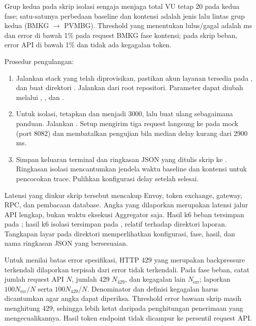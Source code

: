 Grup kedua pada skrip isolasi sengaja menjaga total VU tetap 20 pada kedua fase;
satu-satunya perbedaan baseline dan kontensi adalah jenis lalu lintas grup kedua
(BMKG $\rightarrow$ PVMBG). Threshold yang menentukan lulus/gagal adalah
 ms dan error di bawah 1\% pada request BMKG fase kontensi;
pada skrip beban, error API di bawah 1\% dan tidak ada kegagalan token.

Prosedur pengulangan:
\begin{enumerate}
    \item Jalankan stack yang telah diprovisikan, pastikan akun layanan tersedia
    pada , dan buat direktori .
    Jalankan  dari root repositori.
    Parameter dapat diubah melalui , , dan
    .
    \item Untuk isolasi, tetapkan
     dan
     menjadi 3000, lalu buat ulang
     sebagaimana panduan. Jalankan
    . Setup mengirim tiga
    request langsung ke  pada mock (port 8082) dan
    membatalkan pengujian bila median delay kurang dari 2900 ms.
    \item Simpan keluaran terminal dan ringkasan JSON yang ditulis skrip ke
    . Ringkasan isolasi mencantumkan jendela waktu baseline
    dan kontensi untuk pencocokan trace. Pulihkan konfigurasi delay setelah
    selesai.
\end{enumerate}

Latensi yang diukur skrip tersebut mencakup Envoy, token exchange, gateway,
RPC, dan pembacaan database. Angka yang dilaporkan merupakan latensi jalur API
lengkap, bukan waktu eksekusi Aggregator saja. Hasil k6 beban tersimpan pada
; hasil k6 isolasi tersimpan
pada ,
relatif terhadap direktori laporan. Tangkapan layar pada direktori  memperlihatkan
konfigurasi, fase, hasil, dan nama ringkasan JSON yang bersesuaian.

Untuk menilai batas error spesifikasi, HTTP 429 yang merupakan backpressure
terkendali dilaporkan terpisah dari error tidak terkendali. Pada fase beban,
catat jumlah request API $N$, jumlah 429 $N_{429}$, dan kegagalan lain
$N_{\mathrm{err}}$; laporkan $100N_{\mathrm{err}}/N$ serta
$100N_{429}/N$. Denominator dan definisi kegagalan harus dicantumkan agar
angka dapat diperiksa. Threshold error bawaan skrip masih menghitung 429,
sehingga lebih ketat daripada penghitungan penerimaan yang mengecualikannya.
Hasil token endpoint tidak dicampur ke persentil request API.

